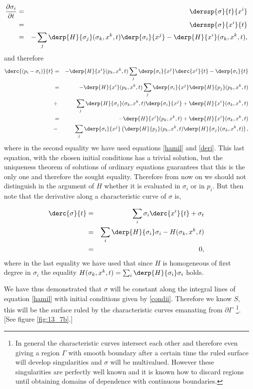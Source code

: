 \begin{eqnarray} 
    \frac{\partial\sigma_i}{\partial t} &=& \derssp{\sigma}{t}{x^i} \nonumber \\ 
    &=& \derssp{\sigma}{x^i}{t} \nonumber \\ 
    &=& -\sum_{j}\derp{H}{\sigma_j} (\sigma_k,x^k,t) \derp{\sigma_i}{x^j} - \derp{H}{x^i}(\sigma_k,x^k,t), 
    \label{deri} 
\end{eqnarray} 
%
and therefore 
\begin{eqnarray} 
    \derc{(p_i - \sigma_i)}{t} &=& - \derp{H}{x^i}(p_k,x^k,t)
    \sum_{j}\derp{\sigma_i}{x^j} \derc{x^j}{t} - \derp{\sigma_i}{t} \nonumber \\ 
    &=& - \derp{H}{x^i}(p_k,x^k,t) \sum_{j}\derp{\sigma_i}{x^j} \derp{H}{p_j}(p_k,x^k,t) \nonumber \\ 
    &+& \sum_{j}\derp{H}{\sigma_j} (\sigma_k,x^k,t) \derp{\sigma_i}{x^j} + \derp{H}{x^i}(\sigma_k,x^k,t) \nonumber \\
    &=& - \derp{H}{x^i}(p_k,x^k,t) + \derp{H}{x^i}(\sigma_k,x^k,t) \nonumber \\ 
    &-& \sum_{j}\derp{\sigma_i}{x^j} \left( \derp{H}{p_j}(p_k,x^k,t)
    \derp{H}{\sigma_j}(\sigma_k,x^k,t) \right), 
\end{eqnarray}
%
where in the second equality we have used equations \ref{hamil} and \ref{deri}. 
This last equation, with the chosen initial conditions has a trivial solution, but the uniqueness theorem of solutions of ordinary equations guarantees that this is the only one and therefore the sought equality. 
Therefore from now on we should not distinguish in the argument of $H$ whether it is evaluated in $\sigma_i$ or in $p_i$.
But then note that the derivative along a characteristic curve of $\sigma$ is, 

\begin{eqnarray} 
    \derc{\sigma}{t} &=& \sum_i \sigma_i\derc{x^i}{t} + \sigma_t \nonumber \\ 
    &=& \sum_i \derp{H}{\sigma_i} \sigma_i - H(\sigma_k,x^k,t) \nonumber \\ 
    &=& 0, 
\end{eqnarray} 
%
where in the last equality we have used that since $H$ is homogeneous of first degree 
in $\sigma_i$ the equality $ H(\sigma_k,x^k,t) = \sum_i \derp{H}{\sigma_i} \sigma_i$ holds.

We have thus demonstrated that $\sigma$ will be constant along the integral lines of equation \ref{hamil} with initial conditions given by \ref{condii}. 
Therefore we know $S$, this will be the surface ruled by the characteristic curves emanating from $\partial \Gamma$~\footnote{In general the characteristic curves intersect 
each other and therefore even giving a region $\Gamma$ with smooth boundary after a certain time the ruled surface will develop singularities and $\sigma$ will be multivalued. 
However these singularities are perfectly well known and it is known how to discard regions until obtaining domains of dependence with continuous boundaries.}. 
[See figure \ref{fig:13_7b}.]

